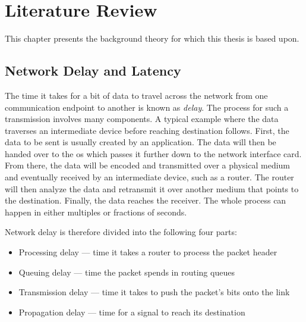 \chapter{Literature Review}


This chapter presents the background theory for which this thesis is based upon.







\section{Network Delay and Latency}

The time it takes for a bit of data to travel across the network from one communication endpoint to another is known as \textit{delay}. The process for such a transmission involves many components. A typical example where the data traverses an intermediate device before reaching destination follows. First, the data to be sent is usually created by an application. The data will then be handed over to the \gls{os} which passes it further down to the network interface card. From there, the data will be encoded and transmitted over a physical medium and eventually received by an intermediate device, such as a router. The router will then analyze the data and retransmit it over another medium that points to the destination. Finally, the data reaches the receiver. The whole process can happen in either multiples or fractions of seconds.


Network delay is therefore divided into the following four parts:

\begin{itemize}
    \item Processing delay --- time it takes a router to process the packet header
    \item Queuing delay --- time the packet spends in routing queues
    \item Transmission delay --- time it takes to push the packet's bits onto the link
    \item Propagation delay --- time for a signal to reach its destination
\end{itemize}

